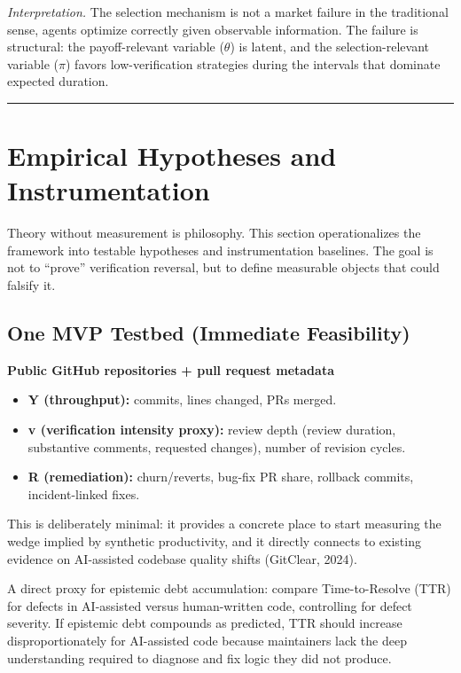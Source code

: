 \documentclass[11pt,a4paper]{article}
\providecommand{\tightlist}{\setlength{\itemsep}{0pt}\setlength{\parskip}{0pt}}
\begin{document}
\emph{Interpretation.} The selection mechanism is not a market failure in the traditional sense, agents optimize correctly given observable information. The failure is structural: the payoff-relevant variable ($\theta$) is latent, and the selection-relevant variable ($\pi$) favors low-verification strategies during the intervals that dominate expected duration.

\begin{center}\rule{0.5\linewidth}{0.5pt}\end{center}

\hypertarget{empirical-hypotheses-and-instrumentation}{%
\section{Empirical Hypotheses and Instrumentation}\label{empirical-hypotheses-and-instrumentation}}

Theory without measurement is philosophy. This section operationalizes the framework into testable hypotheses and instrumentation baselines. The goal is not to ``prove'' verification reversal, but to define measurable objects that could falsify it.

\hypertarget{one-mvp-testbed-immediate-feasibility}{%
\subsection{ One MVP Testbed (Immediate Feasibility)}\label{one-mvp-testbed-immediate-feasibility}}

\textbf{Public GitHub repositories + pull request metadata}

\begin{itemize}
\tightlist
\item
  \textbf{Y (throughput):} commits, lines changed, PRs merged.
\item
  \textbf{v (verification intensity proxy):} review depth (review duration, substantive comments, requested changes), number of revision cycles.
\item
  \textbf{R (remediation):} churn/reverts, bug-fix PR share, rollback commits, incident-linked fixes.
\end{itemize}

This is deliberately minimal: it provides a concrete place to start measuring the wedge implied by synthetic productivity, and it directly connects to existing evidence on AI-assisted codebase quality shifts (GitClear, 2024).

A direct proxy for epistemic debt accumulation: compare Time-to-Resolve (TTR) for defects in AI-assisted versus human-written code, controlling for defect severity. If epistemic debt compounds as predicted, TTR should increase disproportionately for AI-assisted code because maintainers lack the deep understanding required to diagnose and fix logic they did not produce.
\end{document}
